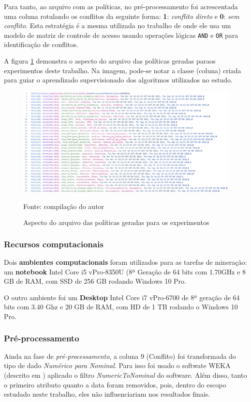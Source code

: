 Para tanto, ao arquivo com as políticas, no pré-processamento foi acrescentada uma coluna rotulando os conflitos da seguinte forma: \textbf{1}: \textit{conflito direto} e \textbf{0}: \textit{sem conflito}. Esta estratégia é a mesma utilizada no trabalho de \cite{davy_application_2008} onde ele usa um modelo de matriz de controle de acesso usando operações lógicas \texttt{AND} e \texttt{OR} para identificação de conflitos.

A figura \ref{fig:aspecto_arquivo} demonstra o aspecto do arquivo das políticas geradas paraos experimentos deste trabalho. Na imagem, pode-se notar a classe (coluna) criada para guiar o aprendizado supervisionado dos algoritmos utilizados no estudo.

\begin{figure}[h!]
	\centering
	\includegraphics[width=.8\textwidth]{imagens/aspecto_arquivo_politicas.png}	
	\caption{Aspecto do arquivo das políticas geradas para os experimentos}
	\label{fig:aspecto_arquivo}
	{\scriptsize Fonte: compilação do autor}
\end{figure}

\subsubsection{Recursos computacionais}
Dois \textbf{ambientes computacionais} foram utilizados para as tarefas de mineração: um \textbf{notebook}  Intel Core i5 vPro-8350U (8ª Geração de 64 bits com 1.70GHz e 8 GB de RAM, com SSD de 256 GB rodando Windows 10 Pro.
 
O outro ambiente foi um \textbf{Desktop} Intel Core i7 vPro-6700 de 8ª geração de 64 bits com 3.40 Ghz e 20 GB de RAM, com HD de 1 TB rodando o Windows 10 Pro.

\subsubsection{Pré-processamento}
Ainda na fase de \textit{pré-processamento}, a coluna 9 (Conflito) foi transformada do tipo de dado \textit{Numérico para Nominal}. Para isso foi usado o softwate WEKA (descrito em \cite{eibe2016}) aplicado o filtro \textit{NumericToNominal} do software. Além disso, tanto o primeiro atributo quanto a data foram removidos, pois, dentro do escopo estudado neste trabalho, eles não influenciariam nos resultados finais.

